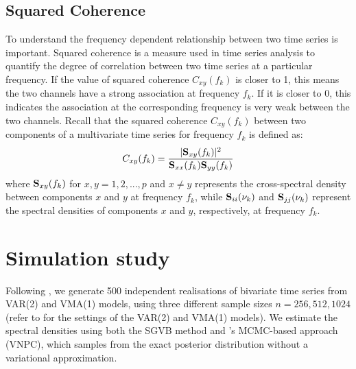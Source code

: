 \documentclass[%
 reprint,
 amsmath,amssymb,
 aps,
 nofootinbib,
]{revtex4-2}
\begin{document}
\subsection{Squared Coherence}
To understand the frequency dependent relationship between two time series is important. Squared coherence is a measure used in time series analysis to quantify the degree of correlation between two time series at a particular frequency. If the value of squared coherence $C_{xy}(f_k)$ is closer to 1, this means the two channels have a strong association at frequency $f_k$. If it is closer to 0, this indicates the association at the corresponding frequency is very weak between the two channels. Recall that the squared coherence $C_{xy}(f_k)$ between two components of a multivariate time series for frequency $f_k$ is defined as:
\begin{align}\label{squared coh}
C_{xy}(f_k) = \frac{|\S_{xy}(f_k)|^2}{\S_{xx}(f_k)\S_{yy}(f_k)}
\end{align}
where $\S_{xy}(f_k)$ for $x,y = 1,2,...,p$ and $x\neq y$ represents the cross-spectral density between components $x$ and $y$ at frequency $f_k$, while $\S_{ii}(\nu_k)$ and $\S_{jj}(\nu_k)$ represent the spectral densities of components $x$ and $y$, respectively, at frequency $f_k$.





\section{Simulation study}
\label{sec:simulation}

Following \citet[Section~4.2,][]{Liu2023}, we generate 500 independent realisations of bivariate time series from VAR(2) and VMA(1) models, using three  different sample sizes $n=256,512,1024$ (refer to \citet{Liu2023} for the settings of the VAR(2) and VMA(1) models). 
We estimate the spectral densities using both the \ac{SGVB} method and \citet{Liu2023}'s MCMC-based approach (VNPC), which samples from the exact posterior distribution without a variational approximation. 
\end{document}
